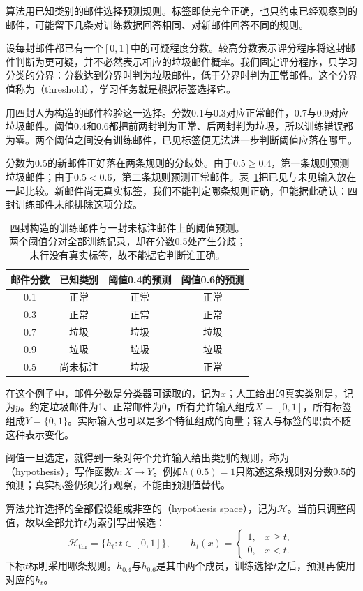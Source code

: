 算法用已知类别的邮件选择预测规则。标签即使完全正确，也只约束已经观察到的邮件，可能留下几条对训练数据回答相同、对新邮件回答不同的规则。

设每封邮件都已有一个$[0,1]$中的可疑程度分数。较高分数表示评分程序将这封邮件判断为更可疑，并不必然表示相应的垃圾邮件概率。我们固定评分程序，只学习分类的分界：分数达到分界时判为垃圾邮件，低于分界时判为正常邮件。这个分界值称为（threshold），学习任务就是根据标签选择它。

用四封人为构造的邮件检验这一选择。分数0.1与0.3对应正常邮件，0.7与0.9对应垃圾邮件。阈值0.4和0.6都把前两封判为正常、后两封判为垃圾，所以训练错误都为零。两个阈值之间没有训练邮件，已见标签便无法进一步判断阈值应落在哪里。

分数为0.5的新邮件正好落在两条规则的分歧处。由于$0.5\geq0.4$，第一条规则预测垃圾邮件；由于$0.5<0.6$，第二条规则预测正常邮件。表~\ref{tab:threshold-email-decisions}把已见与未见输入放在一起比较。新邮件尚无真实标签，我们不能判定哪条规则正确，但能据此确认：四封训练邮件未能排除这项分歧。

\begin{table}[htbp]
 \centering
 \begin{tabular}{cccc}
  \toprule
  邮件分数 & 已知类别 & 阈值0.4的预测 & 阈值0.6的预测\\
  \midrule
  0.1 & 正常 & 正常 & 正常\\
  0.3 & 正常 & 正常 & 正常\\
  0.7 & 垃圾 & 垃圾 & 垃圾\\
  0.9 & 垃圾 & 垃圾 & 垃圾\\
  \midrule
  0.5 & 尚未标注 & 垃圾 & 正常\\
  \bottomrule
 \end{tabular}
 \caption{四封构造的训练邮件与一封未标注邮件上的阈值预测。两个阈值分对全部训练记录，却在分数0.5处产生分歧；末行没有真实标签，故不能据它判断谁正确。}
 \label{tab:threshold-email-decisions}
\end{table}

在这个例子中，邮件分数是分类器可读取的，记为$x$；人工给出的真实类别是，记为$y$。约定垃圾邮件为1、正常邮件为0，所有允许输入组成$X=[0,1]$，所有标签组成$Y=\{0,1\}$。实际输入也可以是多个特征组成的向量；输入与标签的职责不随这种表示变化。

阈值一旦选定，就得到一条对每个允许输入给出类别的规则，称为（hypothesis），写作函数$h:X\to Y$。例如$h(0.5)=1$只陈述这条规则对分数0.5的预测；真实标签仍须另行观察，不能由预测值替代。

算法允许选择的全部假设组成非空的（hypothesis space），记为$\mathcal H$。当前只调整阈值，故以全部允许$t$为索引写出候选：
\begin{equation}
 \mathcal H_{\mathrm{thr}}=\{h_t:t\in[0,1]\},\qquad
 h_t(x)=\begin{cases}
  1,&x\geq t,\\
  0,&x<t.
 \end{cases}
 \label{eq:threshold-hypothesis-class}
\end{equation}
下标$t$标明采用哪条规则。$h_{0.4}$与$h_{0.6}$是其中两个成员，训练选择$t$之后，预测再使用对应的$h_t$。

